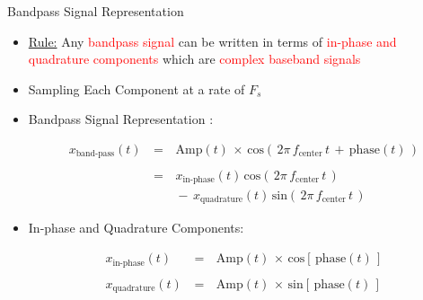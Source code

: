 \begin{frame}[t,allowframebreaks]{Bandpass Signal Representation}

\begin{itemize}
	
\item \underline{Rule:}  Any \textcolor{red}{bandpass signal} can be written in terms of \textcolor{red}{in-phase and quadrature components} which are \textcolor{red}{complex baseband signals}
	
	
\item Sampling Each Component at a rate of $F_s$

\item Bandpass Signal Representation \cite{DSP_Proakis} \cite{paper_bandpass_sampling_theory}:

	\begin{equation}
\begin{array}{rcl}
x_{\text{band-pass}}(t) \, &=&\, \text{Amp}(t) \, \times \, \text{cos}\left(\, 2 \pi \, f_{\text{center}} \, t \, + \, \text{phase}(t) \,\right)\\ \\
&=&\, x_{\text{in-phase}}(t) \, \text{cos}\left( \, 2 \pi \, f_{\text{center}} \, t \,\right) \\
 && \, - \, x_{\text{quadrature}}(t) \, \text{sin}\left( \, 2 \pi \, f_{\text{center}} \, t \,\right)
\end{array}
\label{Eq:Sampling:based_band_general_form_time_domain_recap}
\end{equation}


\item In-phase and Quadrature Components:

	
	\begin{equation}
\begin{array}{rcl}
x_{\text{in-phase}}(t) \, &=& \, \text{Amp}(t) \, \times \, \text{cos}\left[\, \text{phase}(t) \, \right] \\ \\
x_{\text{quadrature}}(t) \, &=& \, \text{Amp}(t) \, \times \, \text{sin}\left[\, \text{phase}(t) \, \right] \\ \\
\end{array}
\label{Eq:Sampling:inpahse_quadrature_signals}
\end{equation}
	
	
\end{itemize}

\end{frame}


